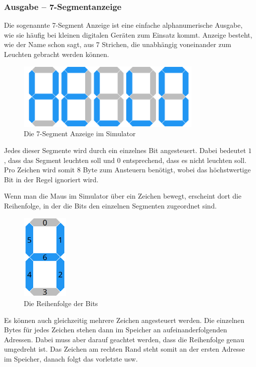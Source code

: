 \subsubsection{Ausgabe -- 7-Segmentanzeige}
Die sogenannte 7-Segment Anzeige ist eine einfache alphanumerische Ausgabe, wie
sie häufig bei kleinen digitalen Geräten zum Einsatz kommt. Anzeige besteht, wie
der Name schon sagt, aus 7 Strichen, die unabhängig voneinander zum Leuchten
gebracht werden können.

\begin{figure}[ht]
	\centering
  \includegraphics[width=0.8\textwidth]{Images/7-Segment_Hello}
	\caption{Die 7-Segment Anzeige im Simulator}
	\label{7-Segment}
\end{figure}

Jedes dieser Segmente wird durch ein einzelnes Bit angesteuert. Dabei bedeutet $1$, dass das Segment leuchten soll und $0$ entsprechend, dass es nicht leuchten soll.
Pro Zeichen wird somit 8 Byte zum Ansteuern benötigt, wobei das höchstwertige Bit in der Regel ignoriert wird.

Wenn man die Maus im Simulator über ein Zeichen bewegt, erscheint dort die Reihenfolge, in der die Bits den einzelnen Segmenten zugeordnet sind.

\begin{figure}[ht]
	\centering
  \includegraphics[width=0.2\textwidth]{Images/7-Segment_Hover}
	\caption{Die Reihenfolge der Bits}
	\label{7-Segment_Hover}
\end{figure}

Es können auch gleichzeitig mehrere Zeichen angesteuert werden. Die einzelnen
Bytes für jedes Zeichen stehen dann im Speicher an aufeinanderfolgenden
Adressen. Dabei muss aber darauf geachtet werden, dass die Reihenfolge genau
umgedreht ist. Das Zeichen am rechten Rand steht somit an der ersten Adresse im
Speicher, danach folgt das vorletzte usw.

